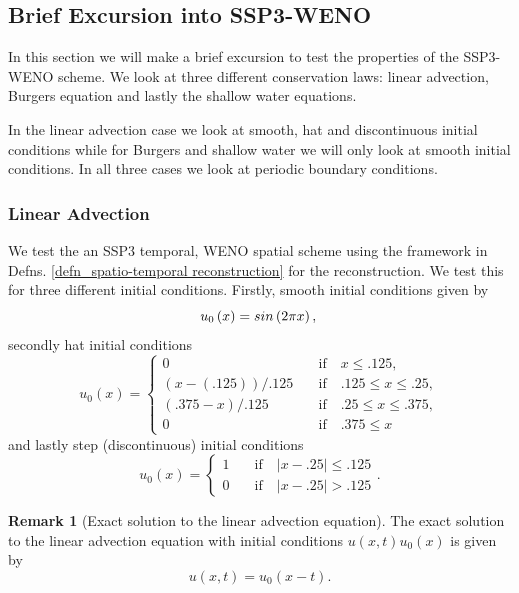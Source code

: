 \documentclass[12pt,a4paper]{article}
\numberwithin{equation}{section}
\theoremstyle{definition}
\newcommand{\norm}[1]{\left|#1\right|}
\newcommand{\qp}[1]{\left(#1\right)}
\newtheorem{Rem}[subsection]{Remark}
\begin{document}
\subsection{Brief Excursion into SSP3-WENO}
In this section we will make a brief excursion to test the properties of the SSP3-WENO scheme. We look at three different conservation laws: linear advection, Burgers equation and lastly the shallow water equations.  

In the linear advection case we look at smooth, hat and discontinuous initial conditions while for Burgers and shallow water we will only look at smooth initial conditions.  In all three cases we look at periodic boundary conditions.
\subsubsection{Linear Advection}
We  test the an SSP3 temporal, WENO spatial scheme using the framework in Defns. \ref{defn_spatio-temporal reconstruction} for the reconstruction.  We test this for three different initial conditions.  Firstly, smooth initial conditions given by 
\begin{equation}\label{eq_ic_sinIC}
u_0\qp{x} = sin\qp{2\pi x},\\
\end{equation}
secondly hat initial conditions
\begin{equation}\label{eq_ic_hat}
u_0\qp{x}=\begin{cases}
0\quad &\text{if} \quad x\leq .125,\\
\qp{x-\qp{  .125}}/.125 \quad &\text{if}\quad .125\leq x\leq .25,\\
\qp{.375-x}/.125\quad&\text{if}\quad  .25\leq x\leq .375,\\
0\quad&\text{if}\quad  .375\leq x
\end{cases}
\end{equation}
and lastly step (discontinuous) initial conditions
\begin{equation}\label{eq_ic_step}
u_0\qp{x}=\begin{cases}
1\quad&\text{if}\quad \norm{x-.25}\leq .125\\
0\quad&\text{if} \quad \norm{x-.25}> .125
\end{cases}.
\end{equation}
\begin{Rem}[Exact solution to the linear advection equation]  The exact solution to the linear advection equation with initial conditions $u\qp{x,t}u_0\qp{x}$ is given by
	\begin{equation}
	u\qp{x,t}=u_0\qp{x-t}.
	\end{equation}
\end{Rem}
\end{document}
